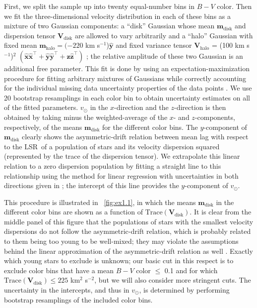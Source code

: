 \documentclass[12pt,preprint]{aastex}
\renewcommand{\vec}[1]{\mathbf{#1}} %
\newcommand{\mm}{\vec{m}}
\newcommand{\eex}{\vec{\hat{x}}}
\newcommand{\eey}{\vec{\hat{y}}}
\newcommand{\eez}{\vec{\hat{z}}}
\newcommand{\ten}[1]{\mathbf{#1}} %
\newcommand{\VV}{\ten{V}}
\newcommand{\T}{^{\scriptscriptstyle \top}}   %
\newcommand{\trace}{\mathrm{Trace}}
\newcommand{\vsunlsr}{\ensuremath{v_\odot}}
\newcommand{\lsrabb}{LSR}
\newcommand{\bminusv}{\ensuremath{B-V}}
\newcommand{\mmdisk}{\mm_{\mathrm{disk}}}
\newcommand{\VVdisk}{\VV_{\mathrm{\!disk}}}
\newcommand{\mmhalo}{\mm_{\mathrm{halo}}}
\newcommand{\VVhalo}{\VV_{\mathrm{\!halo}}}
\begin{document}
First, we split the sample up into twenty equal-number bins in
$\bminusv$ color. Then we fit the three-dimensional velocity
distribution in each of these bins as a mixture of two Gaussian
components: a ``disk'' Gaussian whose mean $\mmdisk$ and dispersion
tensor $\VVdisk$ are allowed to vary arbitrarily and a ``halo''
Gaussian with fixed mean $\mmhalo = (-220$ km s$^{-1}$)$\eey$ and
fixed variance tensor $\VVhalo$ = (100 km s$^{-1}$)$^2$ $(\eex\eex\T +
\eey\eey\T + \eez\eez\T)$ \citep{Sirko04a}; the relative amplitude of
these two Gaussian is an additional free parameter. This fit is done
by using an expectation-maximization procedure for fitting arbitrary
mixtures of Gaussians while correctly accounting for the individual
missing data uncertainty properties of the data points
\citep{Bovy09b}. We use 20 bootstrap resamplings in each color bin to
obtain uncertainty estimates on all of the fitted parameters.
$\vsunlsr$ in the $x$-direction and the $z$-direction is then obtained
by taking minus the weighted-average of the $x$- and $z$-components,
respectively, of the means $\mmdisk$ for the different color bins. The
$y$-component of $\mmdisk$ clearly shows the asymmetric-drift relation
between mean lag with respect to the \lsrabb\ of a population of stars
and its velocity dispersion squared (represented by the trace of the
dispersion tensor). We extrapolate this linear relation to a zero
dispersion population by fitting a straight line to this relationship
using the method for linear regression with uncertainties in both
directions given in \citet{Bovy09b}; the intercept of this line
provides the $y$-component of \vsunlsr.

This procedure is illustrated in \figurename~\ref{fig:ex1.1}, in which
the means $\mmdisk$ in the different color bins are shown as a
function of $\trace(\VVdisk)$. It is clear from the middle panel of
this figure that the populations of stars with the smallest velocity
dispersions do not follow the asymmetric-drift relation, which is
probably related to them being too young to be well-mixed; they may
violate the assumptions behind the linear approximation of the
asymmetric-drift relation as well \citep{Dehnen98a}. Exactly which
young stars to exclude is unknown; our basic cut in this respect is to
exclude color bins that have a mean $\bminusv$ color $\leq$ 0.1 and
for which $\trace(\VVdisk) \leq 225$ km$^2$ s$^{-2}$, but we will also
consider more stringent cuts. The uncertainty in the intercepts, and
thus in \vsunlsr, is determined by performing bootstrap resamplings of
the included color bins.
\end{document}
